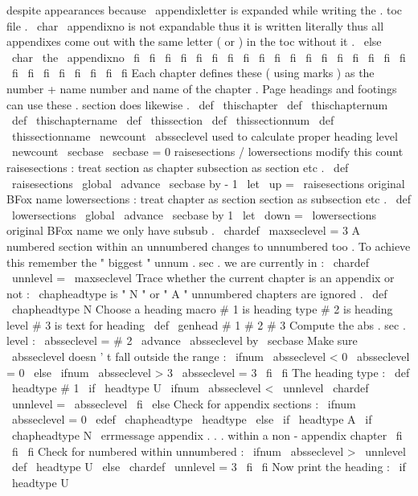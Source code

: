 {{{{despite
appearances
because
\
appendixletter
is
%
expanded
while
writing
the
.
toc
file
.
\
char
\
appendixno
is
not
%
expandable
thus
it
is
written
literally
thus
all
appendixes
come
out
%
with
the
same
letter
(
or
)
in
the
toc
without
it
.
\
else
\
char
\
the
\
appendixno
\
fi
\
fi
\
fi
\
fi
\
fi
\
fi
\
fi
\
fi
\
fi
\
fi
\
fi
\
fi
\
fi
\
fi
\
fi
\
fi
\
fi
\
fi
\
fi
\
fi
\
fi
\
fi
\
fi
\
fi
\
fi
\
fi
}
%
Each
chapter
defines
these
(
using
marks
)
as
the
number
+
name
number
%
and
name
of
the
chapter
.
Page
headings
and
footings
can
use
%
these
.
section
does
likewise
.
\
def
\
thischapter
{
}
\
def
\
thischapternum
{
}
\
def
\
thischaptername
{
}
\
def
\
thissection
{
}
\
def
\
thissectionnum
{
}
\
def
\
thissectionname
{
}
\
newcount
\
absseclevel
%
used
to
calculate
proper
heading
level
\
newcount
\
secbase
\
secbase
=
0
%
raisesections
/
lowersections
modify
this
count
%
raisesections
:
treat
section
as
chapter
subsection
as
section
etc
.
\
def
\
raisesections
{
\
global
\
advance
\
secbase
by
-
1
}
\
let
\
up
=
\
raisesections
%
original
BFox
name
%
lowersections
:
treat
chapter
as
section
section
as
subsection
etc
.
\
def
\
lowersections
{
\
global
\
advance
\
secbase
by
1
}
\
let
\
down
=
\
lowersections
%
original
BFox
name
%
we
only
have
subsub
.
\
chardef
\
maxseclevel
=
3
%
%
A
numbered
section
within
an
unnumbered
changes
to
unnumbered
too
.
%
To
achieve
this
remember
the
"
biggest
"
unnum
.
sec
.
we
are
currently
in
:
\
chardef
\
unnlevel
=
\
maxseclevel
%
%
Trace
whether
the
current
chapter
is
an
appendix
or
not
:
%
\
chapheadtype
is
"
N
"
or
"
A
"
unnumbered
chapters
are
ignored
.
\
def
\
chapheadtype
{
N
}
%
Choose
a
heading
macro
%
#
1
is
heading
type
%
#
2
is
heading
level
%
#
3
is
text
for
heading
\
def
\
genhead
#
1
#
2
#
3
{
%
%
Compute
the
abs
.
sec
.
level
:
\
absseclevel
=
#
2
\
advance
\
absseclevel
by
\
secbase
%
Make
sure
\
absseclevel
doesn
'
t
fall
outside
the
range
:
\
ifnum
\
absseclevel
<
0
\
absseclevel
=
0
\
else
\
ifnum
\
absseclevel
>
3
\
absseclevel
=
3
\
fi
\
fi
%
The
heading
type
:
\
def
\
headtype
{
#
1
}
%
\
if
\
headtype
U
%
\
ifnum
\
absseclevel
<
\
unnlevel
\
chardef
\
unnlevel
=
\
absseclevel
\
fi
\
else
%
Check
for
appendix
sections
:
\
ifnum
\
absseclevel
=
0
\
edef
\
chapheadtype
{
\
headtype
}
%
\
else
\
if
\
headtype
A
\
if
\
chapheadtype
N
%
\
errmessage
{
appendix
.
.
.
within
a
non
-
appendix
chapter
}
%
\
fi
\
fi
\
fi
%
Check
for
numbered
within
unnumbered
:
\
ifnum
\
absseclevel
>
\
unnlevel
\
def
\
headtype
{
U
}
%
\
else
\
chardef
\
unnlevel
=
3
\
fi
\
fi
%
Now
print
the
heading
:
\
if
\
headtype
U
}}}}
